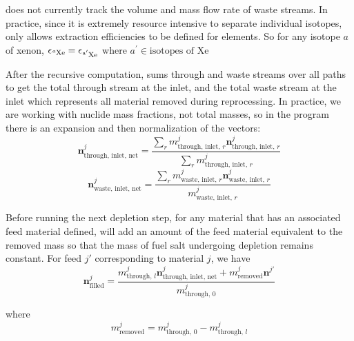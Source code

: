 \SaltProc does not currently track the volume and mass flow rate of waste streams.
In practice, since it is extremely resource intensive to separate individual
isotopes, \SaltProc only allows extraction efficiencies to be defined for
elements. So for any isotope $a$ of xenon,
$\epsilon_{\ce{^{a}Xe}} = \epsilon_{\ce{^{a^{\prime}}Xe}}$  where
$a^{\prime} \in \text{isotopes of Xe}$

After the recursive computation, \SaltProc sums through and waste streams over all
paths to get the total through stream at the inlet, and the total waste stream at
the inlet which represents all material removed during reprocessing. In practice,
we are working with nuclide mass fractions, not total masses, so in the program
there is an expansion and then normalization of the vectors:
\begin{equation}
    \mathbf{n}^{j}_\text{through, inlet, net} = \frac{\sum_{r} m^{j}_{\text{through, inlet, }r} \mathbf{n}^{j}_{\text{through, inlet, }r}}{\sum_{r} m^{j}_{\text{through, inlet, }r}}
\end{equation}
\begin{equation}
    \mathbf{n}^{j}_{\text{waste, inlet, net}} = \frac{\sum_{r} m^{j}_{\text{waste, inlet, }r} \mathbf{n}^{j}_{\text{waste, inlet, }r}}{m^{j}_{\text{waste, inlet, }r}}
\end{equation}

Before running the next depletion step, for any material that has an associated
feed material defined, \SaltProc will add an amount of the feed material
equivalent to the removed mass so that the mass of fuel salt undergoing depletion
remains constant. For feed $j'$ corresponding to material $j$, we have
\begin{equation}
    \mathbf{n}^{j}_\text{filled} = \frac{m^{j}_{\text{through, }l}\mathbf{n}^{j}_\text{through, inlet, net} +  m^{j}_{\text{removed}}\mathbf{n}^{j'}}{m^{j}_{\text{through, }0}}
\end{equation}

where 
\begin{equation}
    m^{j}_\text{removed} = m^{j}_{\text{through, }0} - m^{j}_{\text{through, }l}
\end{equation}
